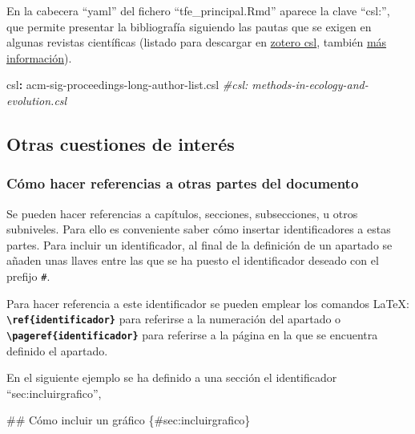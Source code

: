 \documentclass[12pt,a4paper,oneside,]{article}
\newenvironment{Shaded}{\begin{snugshade}}{\end{snugshade}}
\newcommand{\AttributeTok}[1]{\textcolor[rgb]{0.77,0.63,0.00}{#1}}
\newcommand{\CommentTok}[1]{\textcolor[rgb]{0.56,0.35,0.01}{\textit{#1}}}
\newcommand{\FunctionTok}[1]{\textcolor[rgb]{0.00,0.00,0.00}{#1}}
\newcommand{\KeywordTok}[1]{\textcolor[rgb]{0.13,0.29,0.53}{\textbf{#1}}}
\numberwithin{dummy}{section}
\theoremstyle{ocrenumbox}
\theoremstyle{blacknumex}
\theoremstyle{blacknumbox}
\theoremstyle{ocrenum}
\theoremstyle{ocrenum}
\begin{document}
En la cabecera ``yaml'' del fichero ``tfe\_principal.Rmd'' aparece la
clave ``csl:'', que permite presentar la bibliografía siguiendo las
pautas que se exigen en algunas revistas científicas (listado para
descargar en \href{https://www.zotero.org/styles/}{zotero csl}, también
\href{https://citationstyles.org/publishers/}{más información}).

\begin{Shaded}
\begin{Highlighting}[]
\FunctionTok{csl}\KeywordTok{:}\AttributeTok{ acm{-}sig{-}proceedings{-}long{-}author{-}list.csl}
\CommentTok{\#csl: methods{-}in{-}ecology{-}and{-}evolution.csl}
\end{Highlighting}
\end{Shaded}

\hypertarget{otras-cuestiones-de-interuxe9s}{%
\subsection{Otras cuestiones de
interés}\label{otras-cuestiones-de-interuxe9s}}

\hypertarget{cuxf3mo-hacer-referencias-a-otras-partes-del-documento}{%
\subsubsection{Cómo hacer referencias a otras partes del
documento}\label{cuxf3mo-hacer-referencias-a-otras-partes-del-documento}}

Se pueden hacer referencias a capítulos, secciones, subsecciones, u
otros subniveles. Para ello es conveniente saber cómo insertar
identificadores a estas partes. Para incluir un identificador, al final
de la definición de un apartado se añaden unas llaves entre las que se
ha puesto el identificador deseado con el prefijo \texttt{\#}.

Para hacer referencia a este identificador se pueden emplear los
comandos LaTeX: \textbf{\texttt{\textbackslash{}ref\{identificador\}}}
para referirse a la numeración del apartado o
\textbf{\texttt{\textbackslash{}pageref\{identificador\}}} para
referirse a la página en la que se encuentra definido el apartado.

En el siguiente ejemplo se ha definido a una sección el identificador
``sec:incluirgrafico'',

\begin{Shaded}
\begin{Highlighting}[]
\FunctionTok{\#\# Cómo incluir un gráfico \{\#sec:incluirgrafico\}}
\end{Highlighting}
\end{Shaded}
\end{document}
